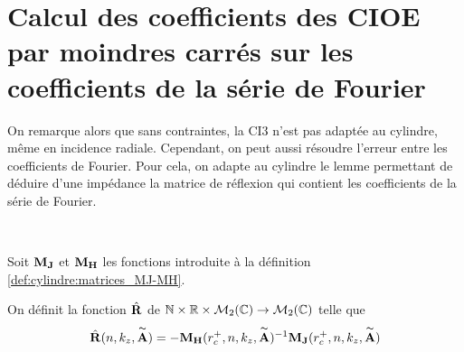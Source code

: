 \section{Calcul des coefficients des CIOE par moindres carrés sur les coefficients de la série de Fourier}

  On remarque alors que sans contraintes, la CI3 n'est pas adaptée au cylindre, même en incidence radiale. Cependant, on peut aussi résoudre l'erreur entre les coefficients de Fourier. Pour cela, on adapte au cylindre le lemme permettant de déduire d'une impédance la matrice de réflexion qui contient les coefficients de la série de Fourier.

  \begin{defn}\label{def:cylindre:reflexion_from_impedance}{}~

    Soit \(\mathbf{M}_{\mathbf{J}}\) et \(\mathbf{M}_{\mathbf{H}}\) les fonctions introduite à la définition \ref{def:cylindre:matrices_MJ-MH}.

    On définit la fonction \(\hat{\mathbf{R}}\) de \(\mathbb N\times\mathbb R\times\mathcal{M}_2(\mathbb C) \rightarrow \mathcal{M}_2(\mathbb C)\) telle que
    \begin{equation*}
      \hat{\mathbf{R}}(n,k_z,\overset{\thicksim}{\mathbf{A}}) = - \mathbf{M}_{\mathbf{H}}(r_c^+,n,k_z,\overset{\thicksim}{\mathbf{A}})^{-1}\mathbf{M}_{\mathbf{J}}(r_c^+,n,k_z,\overset{\thicksim}{\mathbf{A}})
    \end{equation*}
  \end{defn}


